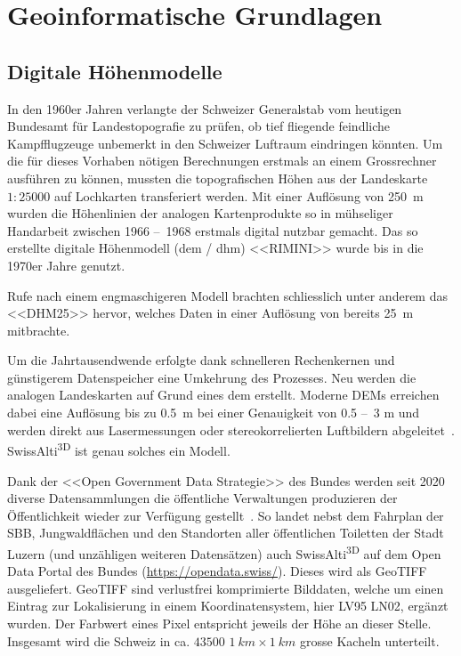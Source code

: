\clearpage
\section{Geoinformatische Grundlagen}

\subsection{Digitale Höhenmodelle}\label{sec:dem}

In den 1960er Jahren verlangte der Schweizer Generalstab vom heutigen Bundesamt für Landestopografie zu prüfen, ob tief fliegende feindliche Kampfflugzeuge unbemerkt in den Schweizer Luftraum eindringen könnten. Um die für dieses Vorhaben nötigen Berechnungen erstmals an einem Grossrechner ausführen zu können, mussten die topografischen Höhen aus der Landeskarte $1:25000$ auf Lochkarten transferiert werden. Mit einer Auflösung von \qty{250}{m} wurden die Höhenlinien der analogen Kartenprodukte so in mühseliger Handarbeit zwischen 1966 --~1968 erstmals digital nutzbar gemacht. Das so erstellte digitale Höhenmodell (\acrshort{dem} / \acrshort{dhm}) <<RIMINI>> wurde bis in die 1970er Jahre genutzt.~\cite{swisstopohistdem}

Rufe nach einem engmaschigeren Modell brachten schliesslich unter anderem das <<DHM25>> hervor, welches Daten in einer Auflösung von bereits \qty{25}{m} mitbrachte.~\cite{swisstopohistdem}

Um die Jahrtausendwende erfolgte dank schnelleren Rechenkernen und günstigerem Datenspeicher eine Umkehrung des Prozesses. Neu werden die analogen Landeskarten auf Grund eines \acrshort{dem} erstellt. Moderne DEMs erreichen dabei eine Auflösung bis zu \qty{0.5}{m} bei einer Genauigkeit von 0.5 --~3 \unit{m} und werden direkt aus Lasermessungen oder stereokorrelierten Luftbildern abgeleitet~\cite{alti3dprod}. SwissAlti\textsuperscript{3D} ist genau solches ein Modell.

Dank der <<Open Government Data Strategie>> des Bundes werden seit 2020 diverse Datensammlungen die öffentliche Verwaltungen produzieren der Öffentlichkeit wieder zur Verfügung gestellt~\cite{opendataswiss}.
So landet nebst dem Fahrplan der SBB, Jungwaldflächen und den Standorten aller öffentlichen Toiletten der Stadt Luzern (und unzähligen weiteren Datensätzen) auch  SwissAlti\textsuperscript{3D} auf dem Open Data Portal des Bundes (\url{https://opendata.swiss/}).
Dieses wird als GeoTIFF ausgeliefert. GeoTIFF sind verlustfrei komprimierte Bilddaten, welche um einen Eintrag zur Lokalisierung in einem Koordinatensystem, hier LV95 LN02, ergänzt wurden. Der Farbwert eines Pixel entspricht jeweils der Höhe an dieser Stelle. Insgesamt wird die Schweiz in ca. $43500$ $\qty{1}{km} \times \qty{1}{km}$ grosse Kacheln unterteilt.~\cite{alti3dprod} 

